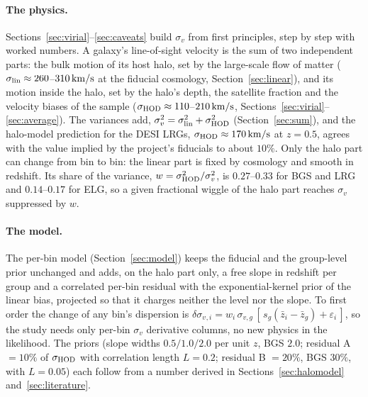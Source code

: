 \documentclass[11pt]{article}
\newcommand{\sv}{\sigma_v}
\newcommand{\svg}{\sigma_{v,g}}
\newcommand{\slin}{\sigma_{\rm lin}}
\newcommand{\shod}{\sigma_{\rm HOD}}
\newcommand{\kms}{\,{\rm km/s}}
\begin{document}
\paragraph{The physics.}
Sections~\ref{sec:virial}--\ref{sec:caveats} build $\sv$ from first
principles, step by step with worked numbers.  A galaxy's line-of-sight
velocity is the sum of two independent parts: the bulk motion of its
host halo, set by the large-scale flow of matter
($\slin \approx 260$--$310\kms$ at the fiducial cosmology,
Section~\ref{sec:linear}), and its motion inside the halo, set by the
halo's depth, the satellite fraction and the velocity biases of the
sample ($\shod \approx 110$--$210\kms$, Sections~\ref{sec:virial}--%
\ref{sec:average}).  The variances add,
$\sv^2 = \slin^2 + \shod^2$ (Section~\ref{sec:sum}), and the halo-model
prediction for the DESI LRGs, $\shod \approx 170\kms$ at $z = 0.5$,
agrees with the value implied by the project's fiducials to about
$10\%$.  Only the halo part can change from bin to bin: the linear part
is fixed by cosmology and smooth in redshift.  Its share of the
variance, $w = \shod^2/\sv^2$, is $0.27$--$0.33$ for BGS and LRG and
$0.14$--$0.17$ for ELG, so a given fractional wiggle of the halo part
reaches $\sv$ suppressed by $w$.

\paragraph{The model.}
The per-bin model (Section~\ref{sec:model}) keeps the fiducial and the
group-level prior unchanged and adds, on the halo part only, a free
slope in redshift per group and a correlated per-bin residual with the
exponential-kernel prior of the linear bias, projected so that it
charges neither the level nor the slope.  To first order the change of
any bin's dispersion is $\delta\sv{}_{,i} = w_i\,\svg\,
[\,s_g(\bar{z}_i - \bar{z}_g) + \varepsilon_i\,]$, so the study needs
only per-bin $\sv$ derivative columns, no new physics in the
likelihood.  The priors (slope widths $0.5/1.0/2.0$ per unit $z$,
BGS $2.0$; residual A $= 10\%$ of $\shod$ with correlation length
$L = 0.2$; residual B $= 20\%$, BGS $30\%$, with $L = 0.05$) each
follow from a number derived in Sections~\ref{sec:halomodel}
and~\ref{sec:literature}.
\end{document}
